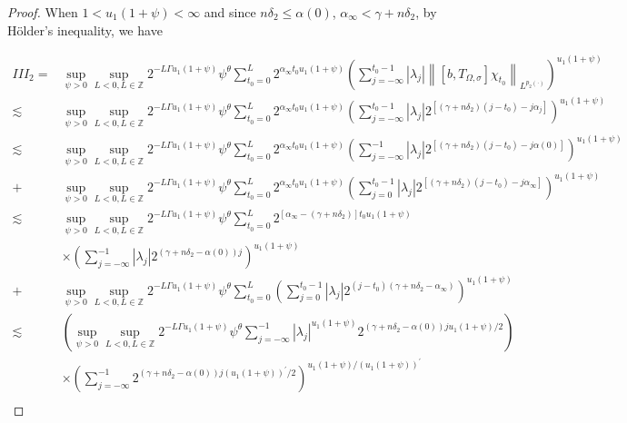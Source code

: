 \documentclass[oneside,reqno]{amsart}
\numberwithin{equation}{section}
\theoremstyle{definition}
\begin{document}
\begin{proof}
When $1<u_1(1+\psi)<\infty$ and since $n \delta_{2} \leq  \alpha(0)$, $\alpha_{\infty}<\gamma+n\delta_2$, by H\"older's inequality, we have


\begin{align*}
I I I_{2}=& \sup_{\psi>0}\sup _{L <  0, L \in \mathbb{Z}} 2^{-L \Gamma u_1(1+\psi)} \psi^\theta \sum_{t_0=0}^{L} 2^{\alpha_{\infty} t_0u _1(1+\psi)}\left(\sum_{j=-\infty}^{t_0-1}\left|\lambda_{j}\right|\left\|\left[b, T_{\Omega, \sigma}\right] \chi_{t_0}\right\|_{L^{p_2(\cdot)}}\right)^{u_1(1+\psi)} \\
 \lesssim & \sup_{\psi>0}\sup _{L <  0, L \in \mathbb{Z}} 2^{-L \Gamma u_1(1+\psi)} \psi^\theta \sum_{t_0=0}^{L} 2^{\alpha_{\infty} t_0u _1(1+\psi)}\left(\sum_{j=-\infty}^{t_0-1}\left|\lambda_{j}\right| 2^{\left[(\gamma+n\delta_2)(j-t_0)-j \alpha_{j}\right]}\right)^{u_1(1+\psi)} \\
\lesssim & \sup_{\psi>0}\sup _{L <  0, L \in \mathbb{Z}} 2^{-L \Gamma u_1(1+\psi)} \psi^\theta \sum_{t_0=0}^{L} 2^{\alpha_{\infty} t_0u _1(1+\psi)}\left(\sum_{j=-\infty}^{-1}\left|\lambda_{j}\right| 2^{\left[(\gamma+n\delta_2)(j-t_0)-j \alpha(0)\right]}\right)^{u_1(1+\psi)} \\
 +&\sup_{\psi>0}\sup _{L <  0, L \in \mathbb{Z}} 2^{-L \Gamma u_1(1+\psi)} \psi^\theta \sum_{t_0=0}^{L} 2^{\alpha_{\infty} t_0u _1(1+\psi)}\left(\sum_{j=0}^{t_0-1}\left|\lambda_{j}\right| 2^{\left[(\gamma+n\delta_2)(j-t_0)-j \alpha_{\infty}\right]}\right)^{u_1(1+\psi)} \\
\lesssim & \sup_{\psi>0}\sup _{L <  0, L \in \mathbb{Z}} 2^{-L \Gamma u_1(1+\psi)} \psi^\theta \sum_{t_0=0}^{L} 2^{\left[\alpha_{\infty}-(\gamma+n\delta_2)\right] t_0u _1(1+\psi)} \\
 &\times \left(\sum_{j=-\infty}^{-1}\left|\lambda_{j}\right| 2^{\left(\gamma+n\delta_2-\alpha(0)\right) j}\right)^{u_1(1+\psi)} \\
+& \sup_{\psi>0}\sup _{L <  0, L \in \mathbb{Z}} 2^{-L \Gamma u_1(1+\psi)} \psi^\theta \sum_{t_0=0}^{L}\left(\sum_{j=0}^{t_0-1}\left|\lambda_{j}\right| 2^{(j-t_0)\left(\gamma+n\delta_2-\alpha_{\infty}\right)}\right)^{u_1(1+\psi)} \\
\lesssim & \left(\sup_{\psi>0}\sup _{L <  0, L \in \mathbb{Z}} 2^{-L \Gamma u_1(1+\psi)} \psi^\theta\sum_{j=-\infty}^{-1}\left|\lambda_{j}\right|^{u_1(1+\psi)} 2^{\left(\gamma+n\delta_2-\alpha(0)\right) j u_1(1+\psi) / 2}\right) \\
 &\times\left(\sum_{j=-\infty}^{-1} 2^{\left(\gamma+n\delta_2-\alpha(0)\right) j (u_1(1+\psi))^{\prime} / 2}\right)^{u_1(1+\psi) / (u_1(1+\psi))^{\prime}} \\

\end{align*}
\end{proof}
\end{document}
